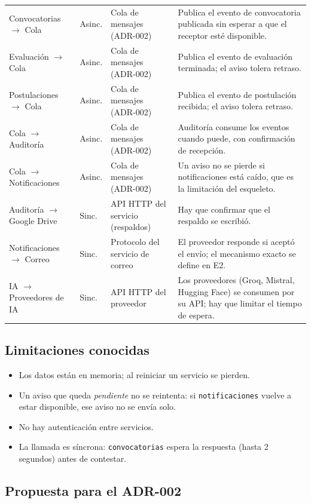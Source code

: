 {\begin{longtable}{@{}p{3.7cm}p{1.3cm}p{2.9cm}p{5.6cm}@{}}
Convocatorias $\to$ Cola & Asinc. & Cola de mensajes (ADR-002) & Publica el evento de convocatoria publicada sin esperar a que el receptor esté disponible. \\
Evaluación $\to$ Cola & Asinc. & Cola de mensajes (ADR-002) & Publica el evento de evaluación terminada; el aviso tolera retraso. \\
Postulaciones $\to$ Cola & Asinc. & Cola de mensajes (ADR-002) & Publica el evento de postulación recibida; el aviso tolera retraso. \\
Cola $\to$ Auditoría & Asinc. & Cola de mensajes (ADR-002) & Auditoría consume los eventos cuando puede, con confirmación de recepción. \\
Cola $\to$ Notificaciones & Asinc. & Cola de mensajes (ADR-002) & Un aviso no se pierde si notificaciones está caído, que es la limitación del esqueleto. \\
Auditoría $\to$ Google Drive & Sinc. & API HTTP del servicio (respaldos) & Hay que confirmar que el respaldo se escribió. \\
Notificaciones $\to$ Correo & Sinc. & Protocolo del servicio de correo & El proveedor responde si aceptó el envío; el mecanismo exacto se define en E2. \\
IA $\to$ Proveedores de IA & Sinc. & API HTTP del proveedor & Los proveedores (Groq, Mistral, Hugging Face) se consumen por su API; hay que limitar el tiempo de espera. \\
\bottomrule
\end{longtable}
}

\subsection{Limitaciones conocidas}

\begin{itemize}[leftmargin=*]
  \item Los datos están en memoria; al reiniciar un servicio se pierden.
  \item Un aviso que queda \emph{pendiente} no se reintenta: si \texttt{notificaciones} vuelve a estar disponible, ese aviso no se envía solo.
  \item No hay autenticación entre servicios.
  \item La llamada es síncrona: \texttt{convocatorias} espera la respuesta (hasta 2 segundos) antes de contestar.
\end{itemize}

\subsection{Propuesta para el ADR-002}


